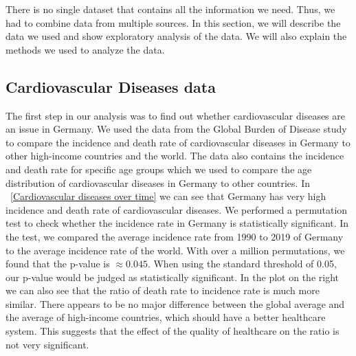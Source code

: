 
There is no single dataset that contains all the information we need. Thus, we had to combine data from multiple sources. In this section, we will describe the data we used and show exploratory analysis of the data. We will also explain the methods we used to analyze the data.

\subsection{Cardiovascular Diseases data}\label{sec:cardiovascular_data}

The first step in our analysis was to find out whether cardiovascular diseases are an issue in Germany. We used the data from the Global Burden of Disease study \citep{GBD2019} 
to compare the incidence and death rate of cardiovascular diseases in Germany to other high-income countries and the world. The data also contains 
the incidence and death rate for specific age groups which we used to compare the age distribution of cardiovascular diseases in Germany to other countries.
In \figurename~\ref{Cardiovascular diseases over time} we can see that Germany has very high incidence and death rate of cardiovascular diseases. 
We performed a permutation test to check whether the incidence rate in Germany is statistically significant. In the test, we compared the average incidence rate from 1990 to 2019 of Germany to the average incidence rate of the world. With over a million permutations, we found that the p-value is $\approx 0.045$. When using the standard threshold of 0.05, our p-value would be judged as statistically significant.
In the plot on the right we can also see that the ratio of death rate to incidence rate is much more similar. There appears to be no major difference between the global average and the average of 
high-income countries, which should have a better healthcare system. This suggests that the effect of the quality of healthcare on the ratio is not very significant.

